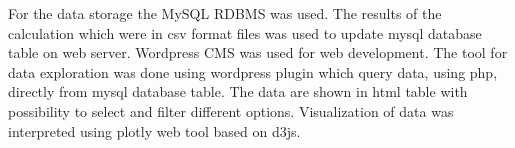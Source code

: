 For the data storage the MySQL RDBMS was used.
The results of the calculation which were in csv format files was used to update mysql database table on web server. Wordpress CMS was used for web development. The tool for data exploration was done using wordpress plugin which query data, using php, directly from mysql database table. The data are shown in html table with possibility to select and filter different options. Visualization of data was interpreted using plotly web tool based on d3js.  

